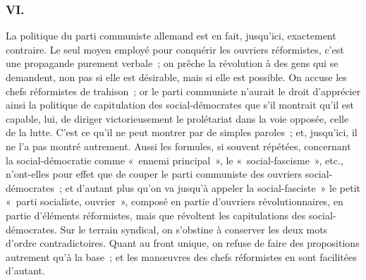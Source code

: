\documentclass[french,twoside]{book} %
\begin{document}
\subsubsection[VI.]{VI.}
\noindent La politique du parti communiste allemand est en fait, jusqu'ici, exacte­ment contraire. Le seul moyen employé pour conquérir les ouvriers réfor­mistes, c'est une propagande purement verbale ; on prêche la révolution à des gens qui se demandent, non pas si elle est désirable, mais si elle est possible. On accuse les chefs réformistes de trahison ; or le parti communiste n'aurait le droit d'apprécier ainsi la politique de capitulation des social-démocrates que s'il montrait qu'il est capable, lui, de diriger victorieusement le prolétariat dans la voie opposée, celle de la lutte. C'est ce qu'il ne peut montrer par de simples paroles ; et, jusqu'ici, il ne l'a pas montré autrement. Aussi les formules, si souvent répétées, concernant la social-démocratie comme « ennemi princi­pal », le « social-fascisme », etc., n'ont-elles pour effet que de couper le parti communiste des ouvriers social-démocrates ; et d'autant plus qu'on va jusqu’à appeler la social-fasciste » le petit « parti socialiste, ouvrier », composé en partie d'ouvriers révolutionnaires, en partie d'éléments réformistes, mais que révoltent les capitulations des social-démocrates. Sur le terrain syndical, on s'obstine à conserver les deux mots d'ordre contradictoires. Quant au front unique, on refuse de faire des propositions autrement qu'à la base ; et les manœuvres des chefs réformistes en sont facilitées d'autant.\par
\end{document}
